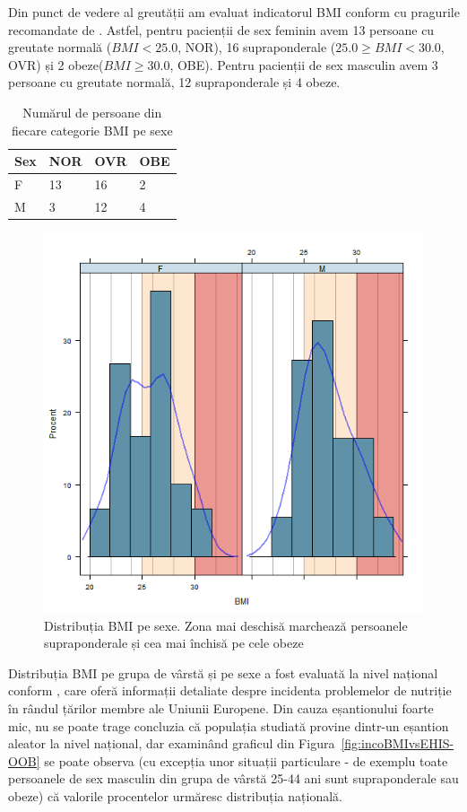 \documentclass[12pt,draft]{article}
\begin{document}
  Din punct de vedere al greutății am evaluat indicatorul \ac{BMI} conform cu pragurile recomandate de \citep{whobmi06}. 
  Astfel, pentru pacienții de sex feminin avem 13 persoane cu greutate normală ($BMI<25.0$, NOR), 16 supraponderale ($25.0 \geq BMI <30.0$, OVR) și 2 obeze($BMI \geq 30.0$, OBE). 
  Pentru pacienții de sex masculin avem 3 persoane cu greutate normală, 12 supraponderale și 4 obeze.   
  \begin{table}[H]
   \centering
   \begin{tabular}{ |l|l|l|l| }
    \hline
    Sex & NOR & OVR & OBE \\ \hline
    F & 13 & 16 & 2 \\ \hline
    M & 3 &  12 & 4 \\ \hline
   \end{tabular}
   \caption{Numărul de persoane din fiecare categorie \ac{BMI} pe sexe}
   \label{tab:BMIgSex}
  \end{table}
  \begin{figure}[H]
    \centering
    \includegraphics[width=0.8\linewidth]{incobmiDens}
    \caption{Distribuția \ac{BMI} pe sexe. Zona mai deschisă marchează persoanele supraponderale și cea mai închisă pe cele obeze}
    \label{fig:incobmiDens}
  \end{figure}
  Distribuția \ac{BMI} pe grupa de vârstă și pe sexe a fost evaluată la nivel național conform \citep{EHIS09}, care oferă informații detaliate despre incidenta problemelor de nutriție în rândul țărilor membre ale Uniunii Europene. 
  Din cauza eșantionului foarte mic, nu se poate trage concluzia că populația studiată provine dintr-un eșantion aleator la nivel național, dar examinând graficul din Figura~\ref{fig:incoBMIvsEHIS-OOB} se poate observa (cu excepția unor situații particulare - de exemplu toate persoanele de sex masculin din grupa de vârstă 25-44 ani sunt supraponderale sau obeze) că valorile procentelor urmăresc distribuția națională.
\end{document}
